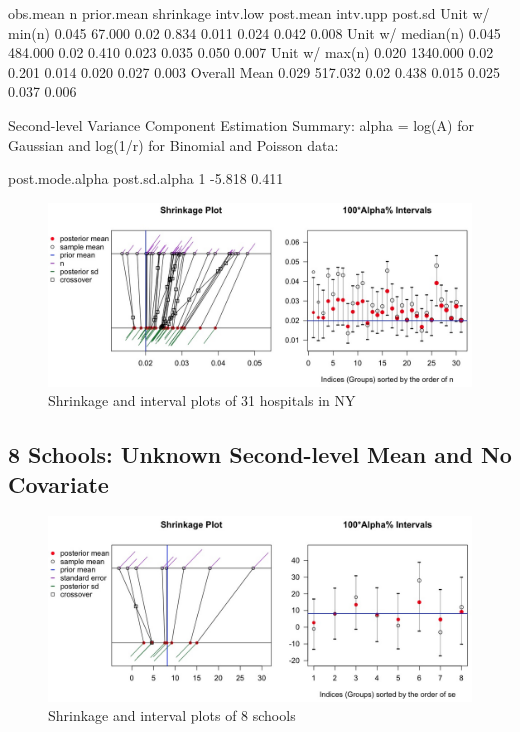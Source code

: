 \documentclass[article]{jss}
\begin{document}
\begin{CodeChunk}
\begin{CodeOutput}
                  obs.mean        n prior.mean shrinkage intv.low post.mean intv.upp post.sd
Unit w/ min(n)       0.045   67.000       0.02     0.834    0.011     0.024    0.042   0.008
Unit w/ median(n)    0.045  484.000       0.02     0.410    0.023     0.035    0.050   0.007
Unit w/ max(n)       0.020 1340.000       0.02     0.201    0.014     0.020    0.027   0.003
Overall Mean         0.029  517.032       0.02     0.438    0.015     0.025    0.037   0.006


Second-level Variance Component Estimation Summary:
alpha = log(A) for Gaussian and log(1/r) for Binomial and Poisson data:

  post.mode.alpha post.sd.alpha
1          -5.818         0.411
\end{CodeOutput}
\end{CodeChunk}
\begin{figure}[h]
\begin{center}
\includegraphics[scale=0.3]{hospital1.png}
\caption{Shrinkage and interval plots of 31 hospitals in NY}
\end{center}
\end{figure}

\subsection[Unknown Second-level Mean and No Covariate]{8 Schools: Unknown Second-level Mean and No Covariate}
\begin{figure}[h]
\begin{center}
\includegraphics[scale=0.3]{school1.png}
\caption{Shrinkage and interval plots of 8 schools}
\end{center}
\end{figure}
\end{document}
